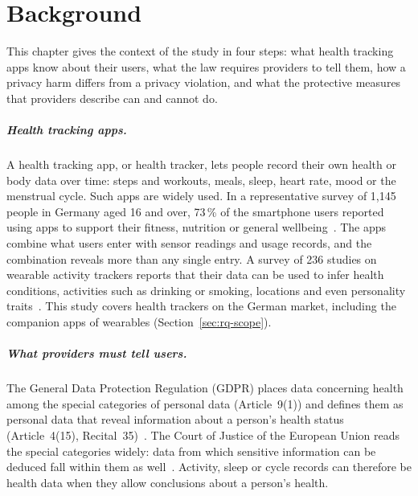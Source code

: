 \chapter{Background}
\label{ch:background}

This chapter gives the context of the study in four steps: what health tracking
apps know about their users, what the law requires providers to tell them, how a
privacy harm differs from a privacy violation, and what the protective measures
that providers describe can and cannot do.

\paragraph{Health tracking apps.} A health tracking app, or health tracker, lets
people record their own health or body data over time: steps and workouts,
meals, sleep, heart rate, mood or the menstrual cycle. Such apps are widely
used. In a representative survey of 1{,}145 people in Germany aged 16 and over,
73\,\% of the smartphone users reported using apps to support their fitness,
nutrition or general wellbeing~\parencite{bitkom2025health}. The apps combine
what users enter with sensor readings and usage records, and the combination
reveals more than any single entry. A survey of 236 studies on wearable activity
trackers reports that their data can be used to infer health conditions,
activities such as drinking or smoking, locations and even personality
traits~\parencite[\S4]{niksirat2024wearable}. This study covers health trackers
on the German market, including the companion apps of wearables
(Section~\ref{sec:rq-scope}).

\paragraph{What providers must tell users.} The General Data Protection
Regulation (GDPR) places data concerning health among the special categories of
personal data (Article~9(1)) and defines them as personal data that reveal
information about a person's health status (Article~4(15),
Recital~35)~\parencite{gdpr2016}. The Court of Justice of the European Union
reads the special categories widely: data from which sensitive information can
be deduced fall within them as
well~\parencite[paras.~120, 127--128]{cjeu2022ot}. Activity, sleep or cycle
records can therefore be health data when they allow conclusions about a
person's health.

